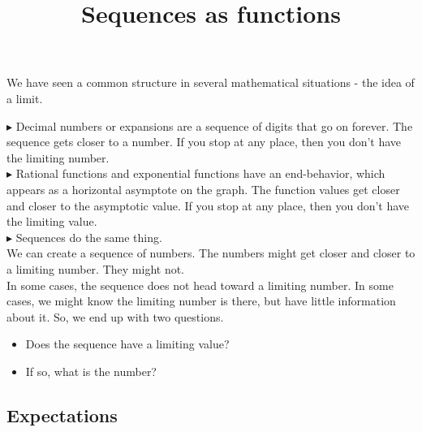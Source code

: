 \documentclass{ximera}
\title{Sequences as functions}
\begin{document}
\begin{abstract}
\end{abstract}

\maketitle




We have seen a common structure in several mathematical situations - the idea of a limit.


\textbf{\textcolor{blue!75!black}{$\blacktriangleright$}}  Decimal numbers or expansions are a sequence of digits that go on forever.  The sequence gets closer to a number. If you stop at any place, then you don't have the limiting number. \\


\textbf{\textcolor{blue!75!black}{$\blacktriangleright$}} Rational functions and exponential functions have an end-behavior, which appears as a horizontal asymptote on the graph.  The function values get closer and closer to the asymptotic value.  If you stop at any place, then you don't have the limiting value. \\


\textbf{\textcolor{blue!75!black}{$\blacktriangleright$}} Sequences do the same thing. \\


We can create a sequence of numbers. The numbers might get closer and closer to a limiting number.  They might not. \\




In some cases, the sequence does not head toward a limiting number. In some cases, we might know the limiting number is there, but have little information about it.  So, we end up with two questions.



\begin{itemize}
\item Does the sequence have a limiting value?
\item If so, what is the number?
\end{itemize}









\subsection{Expectations}
\end{document}
